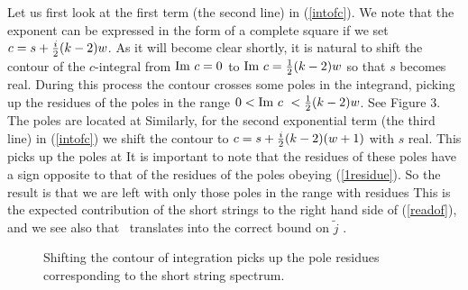 Let us first look at the first term  (the second line)
 in (\ref{intofc}). 
We note that the exponent can be expressed in the form
of a complete square if we set $c=s+{i\over 2}(k-2)w$.
As it will become clear shortly, 
it is natural to shift the contour of the $c$-integral
from ${\rm Im}~c=0$ to ${\rm Im}~ c = {1\over 2}(k-2)w$
so that $s$ becomes real. 
During this process the contour crosses some poles 
in the integrand,  picking up the residues of the poles 
in the range $0<{\rm Im} \ c \ < {1\over 2} (k-2)w$.  See Figure 3.
The poles are located at
Similarly, for the second exponential term (the third line)
in (\ref{intofc}) we shift 
the contour to $c=s+{i\over 2}(k-2)(w+1)$ with $s$ real.
This picks up the poles at 
It is important to note that the residues of these poles 
have a sign opposite to that of the
residues of the poles obeying (\ref{1residue}).
So the result is that we are left with only those poles in the range 
with residues
This is the expected contribution of the short strings to the right 
hand side of (\ref{readof}), and we see also that \boundonc\   
translates into the correct bound on $\tilde{j}$ \rangej .
\begin{figure}[htb]
\begin{center}
\epsfxsize=4.0in\leavevmode{}
\end{center}
\caption{Shifting the contour of integration picks up the pole
residues corresponding to the short string spectrum.}
\label{fig:fig2}
\end{figure}

